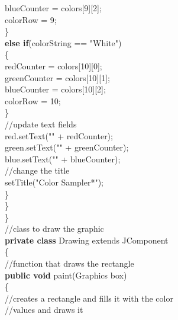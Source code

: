 \documentclass[12pt]{article}
\begin{document}
\begin{flushleft}
{\qquad \qquad \qquad \qquad \qquad \qquad					blueCounter = colors[9][2];\\
\qquad \qquad \qquad \qquad \qquad \qquad					colorRow = 9;\\ 
\qquad \qquad \qquad \qquad \qquad				\}\\
\qquad \qquad \qquad \qquad \qquad				\textbf{else if}(colorString == "White")\\
\qquad \qquad \qquad \qquad \qquad				\{\\
\qquad \qquad \qquad \qquad \qquad \qquad		redCounter = colors[10][0];\\ 
\qquad \qquad \qquad \qquad \qquad \qquad		greenCounter = colors[10][1];\\
\qquad \qquad \qquad \qquad \qquad \qquad		blueCounter = colors[10][2];\\ 
\qquad \qquad \qquad \qquad \qquad \qquad		colorRow = 10;\\
\qquad \qquad \qquad \qquad \qquad	\}\\
				[2mm]
\qquad \qquad \qquad \qquad \qquad		//update text fields\\
\qquad \qquad \qquad \qquad \qquad		red.setText("" + redCounter);\\
\qquad \qquad \qquad \qquad \qquad		green.setText("" + greenCounter);\\   
\qquad \qquad \qquad \qquad \qquad	blue.setText("" + blueCounter);\\
				[2mm]
\qquad \qquad \qquad \qquad \qquad	//change the title\\
\qquad \qquad \qquad \qquad \qquad	setTitle("Color Sampler*");\\  
\qquad \qquad \qquad \qquad	\}\\
\qquad \qquad \qquad	\}\\
 \qquad \qquad	\}\\
		[2mm]
\qquad \qquad	//class to draw the graphic\\
\qquad \qquad	\textbf{private class} Drawing extends JComponent\\
\qquad \qquad	\{\\
\qquad \qquad \qquad	//function that draws the rectangle\\
\qquad \qquad \qquad	\textbf{public void} paint(Graphics box)\\
\qquad \qquad \qquad	\{\\
\qquad \qquad \qquad \qquad	//creates a rectangle and fills it with the color\\
\qquad \qquad \qquad \qquad //values and draws it\\
}
\end{flushleft}
\end{document}

